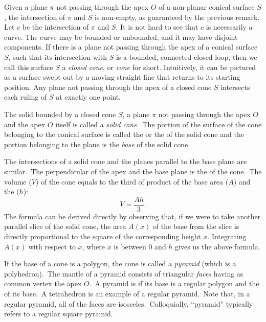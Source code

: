 \documentclass[12pt]{article}
\theoremstyle{definition}
\begin{document}
Given a plane $\pi$ not passing through the apex $O$ of a non-planar conical surface $S$, the intersection of $\pi$ and $S$ is non-empty, as guaranteed by the previous remark.  Let $c$ be the intersection of $\pi$ and $S$.  It is not hard to see that $c$ is necessarily a curve.  The curve may be bounded or unbounded, and it may have disjoint components.  If there is a plane not passing
through the apex of a conical surface $S$, such that its intersection with $S$ is a bounded, connected closed loop, then we call this surface $S$ a \emph{closed cone}, or \emph{cone} for short.  Intuitively, it can be pictured as a surface swept out by a moving straight line that returns to its starting position.  Any plane not passing through the apex of a closed cone $S$ intersects each ruling of $S$ at exactly one point.

The solid bounded by a closed cone $S$, a plane $\pi$ not passing through the apex $O$ and the apex $O$ itself is called a \emph{solid cone}.\, The portion of the surface of the cone belonging to the conical surface is called the  or the  of the solid cone and the portion belonging to the plane is the {\em base} of the solid cone.\,

The intersections of a solid cone and the planes parallel to the
base plane are similar.\, The perpendicular
 of the apex and the base plane is the
 of the cone.\, The volume ($V$) of
the cone equals to the third of product of the base area ($A$) and
the  ($h$):
                              $$V = \frac{Ah}{3}.$$
The formula can be derived directly by observing that, if we were to take another parallel slice of the solid cone, the area $A(x)$ of the base from the slice is directly proportional to the square of the corresponding height $x$.  Integrating $A(x)$ with respect to $x$, where $x$ is between $0$ and $h$ gives us the above formula.

If the base of a cone is a polygon, the cone is called a {\em pyramid} (which is a polyhedron).\, The mantle of a pyramid consists of triangular {\em faces} having as common vertex the apex $O$.\,  A pyramid is  if its base is a regular polygon and the  of its base.\,  A tetrahedron is an example of a regular pyramid.\, Note that, in a regular pyramid, all of the faces are isosceles.\, Colloquially, ``pyramid'' typically refers to a regular square pyramid.
\end{document}
